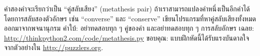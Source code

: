 \begin{exercise}


คำสองคำจะเรียกว่าเป็น ``คู่สลับเสียง'' (metathesis pair)
ถ้าเราสามารถแปลงคำหนึ่งเป็นอีกคำได้โดยการสลับสองตัวอักษร
เช่น ``converse'' และ ``conserve''
เขียนโปรแกรมที่หาคู่สลับเสียงทั้งหมดออกมาจากพจนานุกรม
คำใบ้: อย่าทดสอบทุก ๆ คู่ของคำ
และอย่าทดสอบทุก ๆ การสลับอักษร
เฉลย: \url{http://thinkpython2.com/code/metathesis.py}  
%
ขอบคุณ: 
แบบฝึกหัดนี้ได้รับแรงบันดาลใจจากตัวอย่างใน \url{http://puzzlers.org}.

\end{exercise}
\vspace{0.5cm}


